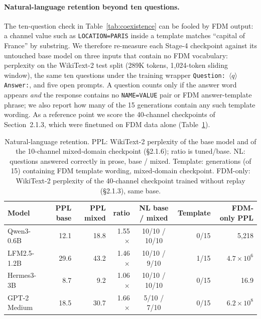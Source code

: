 
\paragraph{Natural-language retention beyond ten questions.}
The ten-question check in Table~\ref{tab:coexistence} can be fooled by FDM output: a channel value such as
\texttt{LOCATION=PARIS} inside a template matches ``capital of France'' by substring. We therefore re-measure
each Stage-4 checkpoint against its untouched base model on three inputs that contain no FDM vocabulary:
perplexity on the WikiText-2 test split (289K tokens, 1{,}024-token sliding window), the same ten questions
under the training wrapper \texttt{Question:}~$\langle q\rangle$ \texttt{Answer:}, and five open prompts.
A question counts only if the answer word appears \emph{and} the response contains no \texttt{NAME=VALUE}
pair or FDM answer-template phrase; we also report how many of the 15 generations contain any such
template wording. As a reference point we score the 40-channel checkpoints of Section~2.1.3, which were
finetuned on FDM data alone (Table~\ref{tab:nl_retention}).

\begin{table}[h]
\centering
\caption{Natural-language retention. PPL: WikiText-2 perplexity of the base model and of the 10-channel
mixed-domain checkpoint (\S2.1.6); ratio is tuned/base. NL: questions answered correctly in prose, base /
mixed. Template: generations (of 15) containing FDM template wording, mixed-domain checkpoint. FDM-only:
WikiText-2 perplexity of the 40-channel checkpoint trained without replay (\S2.1.3), same base.}
\label{tab:nl_retention}
\small
\begin{tabular}{lrrrcrr}
\toprule
Model & PPL base & PPL mixed & ratio & NL base / mixed & Template & FDM-only PPL \\
\midrule
Qwen3-0.6B   & 12.1 & 18.8 & 1.55$\times$ & 10/10 / 10/10 & 0/15 & 5{,}218 \\
LFM2.5-1.2B  & 29.6 & 43.2 & 1.46$\times$ & 10/10 / \phantom{0}9/10 & 1/15 & $4.7\times10^{6}$ \\
Hermes3-3B   &  8.7 &  9.2 & 1.06$\times$ & 10/10 / 10/10 & 0/15 & 16.9 \\
GPT-2 Medium & 18.5 & 30.7 & 1.66$\times$ & \phantom{0}5/10 / \phantom{0}7/10 & 0/15 & $6.2\times10^{8}$ \\
\bottomrule
\end{tabular}
\end{table}

